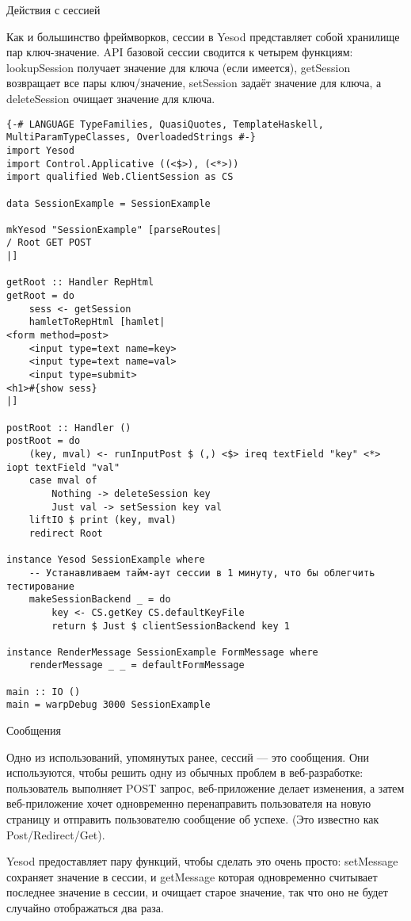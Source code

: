 Действия с сессией

Как и большинство фреймворков, сессии в Yesod представляет собой хранилище пар ключ-значение. API базовой сессии сводится к четырем функциям: lookupSession получает значение для ключа (если имеется), getSession возвращает все пары ключ/значение, setSession задаёт значение для ключа, а deleteSession очищает значение для ключа.

\begin{lstlisting}
{-# LANGUAGE TypeFamilies, QuasiQuotes, TemplateHaskell, MultiParamTypeClasses, OverloadedStrings #-}
import Yesod
import Control.Applicative ((<$>), (<*>))
import qualified Web.ClientSession as CS

data SessionExample = SessionExample

mkYesod "SessionExample" [parseRoutes|
/ Root GET POST
|]

getRoot :: Handler RepHtml
getRoot = do
    sess <- getSession
    hamletToRepHtml [hamlet|
<form method=post>
    <input type=text name=key>
    <input type=text name=val>
    <input type=submit>
<h1>#{show sess}
|]

postRoot :: Handler ()
postRoot = do
    (key, mval) <- runInputPost $ (,) <$> ireq textField "key" <*> iopt textField "val"
    case mval of
        Nothing -> deleteSession key
        Just val -> setSession key val
    liftIO $ print (key, mval)
    redirect Root

instance Yesod SessionExample where
    -- Устанавливаем тайм-аут сессии в 1 минуту, что бы облегчить тестирование
    makeSessionBackend _ = do
        key <- CS.getKey CS.defaultKeyFile
        return $ Just $ clientSessionBackend key 1

instance RenderMessage SessionExample FormMessage where
    renderMessage _ _ = defaultFormMessage

main :: IO ()
main = warpDebug 3000 SessionExample
\end{lstlisting}

Сообщения

Одно из использований, упомянутых ранее, сессий --- это сообщения. Они используются, чтобы решить одну из обычных проблем в веб-разработке: пользователь выполняет POST запрос, веб-приложение делает изменения, а затем веб-приложение хочет одновременно перенаправить пользователя на новую страницу и отправить пользователю сообщение об успехе. (Это известно как Post/Redirect/Get).

Yesod предоставляет пару функций, чтобы сделать это очень просто: setMessage сохраняет значение в сессии, и getMessage которая одновременно считывает последнее значение в сессии, и очищает старое значение, так что оно не будет случайно отображаться два раза. 

